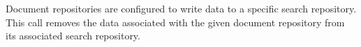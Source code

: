 Document repositories are configured to write data to a specific search repository. This call
removes the data associated with the given document repository from its associated search repository.
